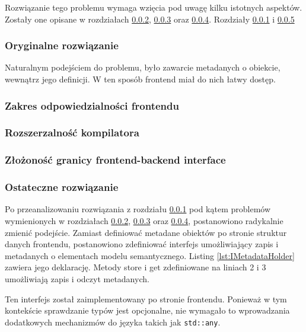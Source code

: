 Rozwiązanie tego problemu wymaga wzięcia pod uwagę kilku istotnych aspektów.
Zostały one opisane w rozdziałach \ref{frontend_responsibility}, \ref{compiler_extensibility} oraz \ref{frontend_backend_complexity}.
Rozdziały \ref{original_solution} i \ref{final_solution}

\subsubsection{Oryginalne rozwiązanie}\label{original_solution}

Naturalnym podejściem do problemu, było zawarcie metadanych o obiekcie, wewnątrz jego definicji.
W ten sposób frontend miał do nich łatwy dostęp.

\subsubsection{Zakres odpowiedzialności frontendu} \label{frontend_responsibility}

\subsubsection{Rozszerzalność kompilatora}\label{compiler_extensibility}

\subsubsection{Złożoność granicy frontend-backend interface} \label{frontend_backend_complexity}

\subsubsection{Ostateczne rozwiązanie}\label{final_solution}
Po przeanalizowaniu rozwiązania z rozdziału \ref{original_solution} pod kątem problemów wymienionych w rozdziałach \ref{frontend_responsibility}, \ref{compiler_extensibility} oraz \ref{frontend_backend_complexity}, postanowiono radykalnie zmienić podejście.
Zamiast definiować metadane obiektów po stronie struktur danych frontendu, postanowiono zdefiniować interfejs umożliwiający zapis i metadanych o elementach modelu semantycznego. 
Listing \ref{lst:IMetadataHolder} zawiera jego deklarację.
Metody store i get zdefiniowane na liniach 2 i 3 umożliwiają zapis i odczyt metadanych.

Ten interfejs został zaimplementowany po stronie frontendu.
Ponieważ w tym kontekście sprawdzanie typów jest opcjonalne, nie wymagało to wprowadzania dodatkowych mechanizmów do języka takich jak \texttt{std::any}.

